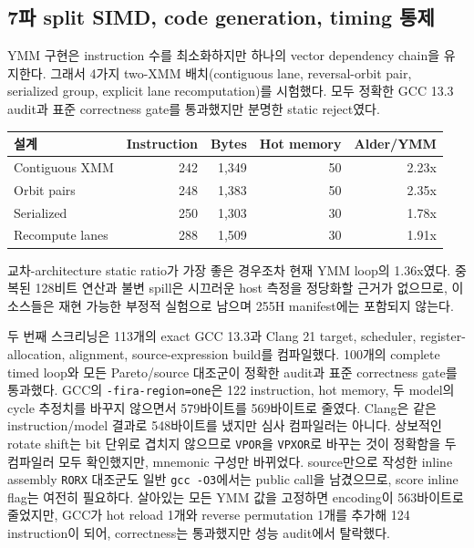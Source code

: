 \documentclass[11pt,a4paper]{article}
\begin{document}
\subsection{7파 split SIMD, code generation, timing 통제}

YMM 구현은 instruction 수를 최소화하지만 하나의 vector dependency chain을
유지한다.  그래서 4가지 two-XMM 배치(contiguous lane, reversal-orbit
pair, serialized group, explicit lane recomputation)를 시험했다.  모두
정확한 GCC 13.3 audit과 표준 correctness gate를 통과했지만 분명한
static reject였다.

\begin{center}
\small
\begin{tabular}{lrrrr}
\toprule
설계 & Instruction & Bytes & Hot memory & Alder/YMM \\
\midrule
Contiguous XMM & 242 & 1,349 & 50 & 2.23x \\
Orbit pairs & 248 & 1,383 & 50 & 2.35x \\
Serialized & 250 & 1,303 & 30 & 1.78x \\
Recompute lanes & 288 & 1,509 & 30 & 1.91x \\
\bottomrule
\end{tabular}
\end{center}

교차-architecture static ratio가 가장 좋은 경우조차 현재 YMM loop의
1.36x였다.  중복된 128비트 연산과 불변 spill은 시끄러운 host 측정을
정당화할 근거가 없으므로, 이 소스들은 재현 가능한 부정적 실험으로
남으며 255H manifest에는 포함되지 않는다.

두 번째 스크리닝은 113개의 exact GCC 13.3과 Clang 21 target, scheduler,
register-allocation, alignment, source-expression build를 컴파일했다.
100개의 complete timed loop와 모든 Pareto/source 대조군이 정확한
audit과 표준 correctness gate를 통과했다.  GCC의
\texttt{-fira-region=one}은 122 instruction, hot memory, 두 model의
cycle 추정치를 바꾸지 않으면서 579바이트를 569바이트로 줄였다.  Clang은
같은 instruction/model 결과로 548바이트를 냈지만 심사 컴파일러는
아니다.  상보적인 rotate shift는 bit 단위로 겹치지 않으므로
\texttt{VPOR}을 \texttt{VPXOR}로 바꾸는 것이 정확함을 두 컴파일러
모두 확인했지만, mnemonic 구성만 바뀌었다.  source만으로 작성한
inline assembly \texttt{RORX} 대조군도 일반 \texttt{gcc -O3}에서는
public call을 남겼으므로, score inline flag는 여전히 필요하다.  살아있는
모든 YMM 값을 고정하면 encoding이 563바이트로 줄었지만, GCC가 hot
reload 1개와 reverse permutation 1개를 추가해 124 instruction이 되어,
correctness는 통과했지만 성능 audit에서 탈락했다.
\end{document}
